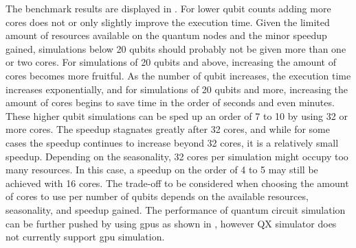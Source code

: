 The benchmark results are displayed in .
For lower qubit counts adding more cores does not or only slightly improve the execution time.
Given the limited amount of resources available on the quantum nodes and the minor speedup gained, simulations below 20 qubits should probably not be given more than one or two cores.
For simulations of 20 qubits and above, increasing the amount of cores becomes more fruitful.
As the number of qubit increases, the execution time increases exponentially, and for simulations of 20 qubits and more, increasing the amount of cores begins to save time in the order of seconds and even minutes.
These higher qubit simulations can be sped up an order of 7 to 10 by using 32 or more cores.
The speedup stagnates greatly after 32 cores, and while for some cases the speedup continues to increase beyond 32 cores, it is a relatively small speedup.
Depending on the seasonality, 32 cores per simulation might occupy too many resources.
In this case, a speedup on the order of 4 to 5 may still be achieved with 16 cores.
The trade-off to be considered when choosing the amount of cores to use per number of qubits depends on the available resources, seasonality, and speedup gained.
The performance of quantum circuit simulation can be further pushed by using \glspl{gpu} as shown in \cite[Appendix B]{oud2019simulation}, however QX simulator does not currently support \gls{gpu} simulation.

\clearpage

